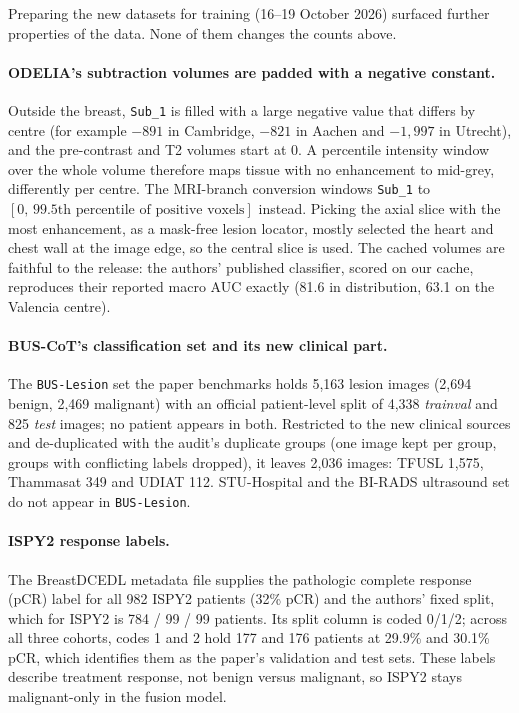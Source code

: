 \documentclass[11pt]{article}
\begin{document}
Preparing the new datasets for training (16--19 October 2026) surfaced
further properties of the data. None of them changes the counts above.

\paragraph{ODELIA's subtraction volumes are padded with a negative constant.}
Outside the breast, \texttt{Sub\_1} is filled with a large negative value that
differs by centre (for example $-891$ in Cambridge, $-821$ in Aachen and
$-1{,}997$ in Utrecht), and the pre-contrast and T2 volumes start at 0. A
percentile intensity window over the whole volume therefore maps tissue with
no enhancement to mid-grey, differently per centre. The MRI-branch conversion
windows \texttt{Sub\_1} to $[0,\,\text{99.5th percentile of positive voxels}]$
instead. Picking the axial slice with the most enhancement, as a mask-free
lesion locator, mostly selected the heart and chest wall at the image edge,
so the central slice is used. The cached volumes are faithful to the release:
the authors' published classifier, scored on our cache, reproduces their
reported macro AUC exactly (81.6 in distribution, 63.1 on the Valencia centre).

\paragraph{BUS-CoT's classification set and its new clinical part.} The
\texttt{BUS-Lesion} set the paper benchmarks holds 5,163 lesion images (2,694
benign, 2,469 malignant) with an official patient-level split of 4,338
\emph{trainval} and 825 \emph{test} images; no patient appears in both.
Restricted to the new clinical sources and de-duplicated with the audit's
duplicate groups (one image kept per group, groups with conflicting labels
dropped), it leaves 2,036 images: TFUSL 1,575, Thammasat 349 and UDIAT 112.
STU-Hospital and the BI-RADS ultrasound set do not appear in \texttt{BUS-Lesion}.

\paragraph{ISPY2 response labels.} The BreastDCEDL metadata file supplies the
pathologic complete response (pCR) label for all 982 ISPY2 patients (32\%
pCR) and the authors' fixed split, which for ISPY2 is 784 / 99 / 99
patients. Its split column is coded 0/1/2; across all three cohorts, codes 1
and 2 hold 177 and 176 patients at 29.9\% and 30.1\% pCR, which identifies
them as the paper's validation and test sets. These labels describe treatment
response, not benign versus malignant, so ISPY2 stays malignant-only in the
fusion model.
\end{document}
